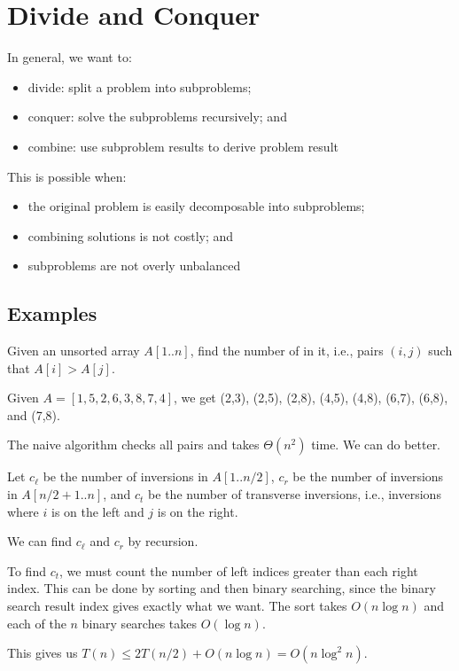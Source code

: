 \chapter{Divide and Conquer}
In general, we want to:
\begin{itemize}[nosep]
  \item divide: split a problem into subproblems;
  \item conquer: solve the subproblems recursively; and
  \item combine: use subproblem results to derive problem result
\end{itemize}
This is possible when:
\begin{itemize}[nosep]
  \item the original problem is easily decomposable into subproblems;
  \item combining solutions is not costly; and
  \item subproblems are not overly unbalanced
\end{itemize}

\section{Examples}
\begin{problem}
Given an unsorted array $A[1..n]$, find the number of  in it,
i.e., pairs $(i,j)$ such that $A[i] > A[j]$.
\end{problem}
\begin{example}
  Given $A = [1,5,2,6,3,8,7,4]$,
  we get (2,3), (2,5), (2,8), (4,5), (4,8), (6,7), (6,8), and (7,8).
\end{example}
The naive algorithm checks all pairs and takes $\Theta(n^2)$ time.
We can do better.

Let $c_\ell$ be the number of inversions in $A[1..n/2]$,
$c_r$ be the number of inversions in $A[n/2+1..n]$,
and $c_t$ be the number of transverse inversions, i.e.,
inversions where $i$ is on the left and $j$ is on the right.

We can find $c_\ell$ and $c_r$ by recursion.

To find $c_t$, we must count the number of left indices
greater than each right index.
This can be done by sorting and then binary searching,
since the binary search result index gives exactly what we want.
The sort takes $O(n\log n)$ and each of the $n$ binary searches takes $O(\log n)$.

This gives us $T(n) \leq 2T(n/2) + O(n\log n) = O(n\log^2 n)$.


